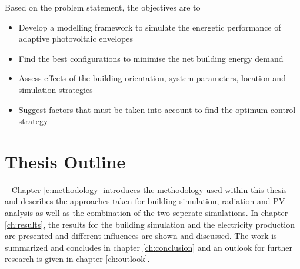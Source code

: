 	Based on the problem statement, the objectives are to

	\begin{itemize}
		\item Develop a modelling framework to simulate the energetic performance of adaptive photovoltaic envelopes
		\item Find the best configurations to minimise the net building energy demand
		\item Assess effects of the building orientation, system parameters, location and simulation strategies
		\item Suggest factors that must be taken into account to find the optimum control strategy
	\end{itemize}


\section{Thesis Outline}\
	Chapter \ref{c:methodology} introduces the methodology used within this thesis and describes the approaches taken for building simulation, radiation and PV analysis as well as the combination of the two seperate simulations. In chapter \ref{ch:results}, the results for the building simulation and the electricity production are presented and different influences are shown and discussed. The work is summarized and concludes in chapter \ref{ch:conclusion} and an outlook for further research is given in chapter \ref{ch:outlook}. 

